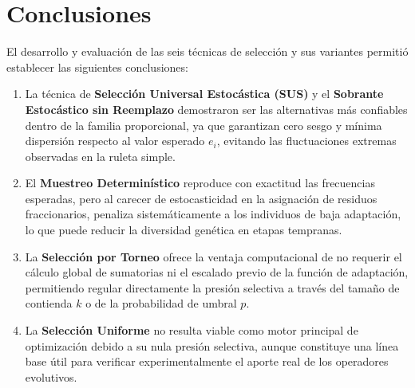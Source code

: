 \documentclass[11pt,letterpaper]{article}
\begin{document}
\section{Conclusiones}
El desarrollo y evaluación de las seis técnicas de selección y sus variantes permitió establecer las siguientes conclusiones:
\begin{enumerate}
    \item La técnica de \textbf{Selección Universal Estocástica (SUS)} y el \textbf{Sobrante Estocástico sin Reemplazo} demostraron ser las alternativas más confiables dentro de la familia proporcional, ya que garantizan cero sesgo y mínima dispersión respecto al valor esperado $e_i$, evitando las fluctuaciones extremas observadas en la ruleta simple.
    \item El \textbf{Muestreo Determinístico} reproduce con exactitud las frecuencias esperadas, pero al carecer de estocasticidad en la asignación de residuos fraccionarios, penaliza sistemáticamente a los individuos de baja adaptación, lo que puede reducir la diversidad genética en etapas tempranas.
    \item La \textbf{Selección por Torneo} ofrece la ventaja computacional de no requerir el cálculo global de sumatorias ni el escalado previo de la función de adaptación, permitiendo regular directamente la presión selectiva a través del tamaño de contienda $k$ o de la probabilidad de umbral $p$.
    \item La \textbf{Selección Uniforme} no resulta viable como motor principal de optimización debido a su nula presión selectiva, aunque constituye una línea base útil para verificar experimentalmente el aporte real de los operadores evolutivos.
\end{enumerate}
\end{document}
